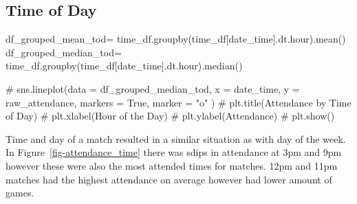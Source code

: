 \documentclass[
  letterpaper,
  DIV=11,
  numbers=noendperiod]{scrartcl}
\newenvironment{Shaded}{\begin{snugshade}}{\end{snugshade}}
\newcommand{\CommentTok}[1]{\textcolor[rgb]{0.37,0.37,0.37}{#1}}
\newcommand{\NormalTok}[1]{\textcolor[rgb]{0.00,0.23,0.31}{#1}}
\newcommand{\OperatorTok}[1]{\textcolor[rgb]{0.37,0.37,0.37}{#1}}
\newcommand{\StringTok}[1]{\textcolor[rgb]{0.13,0.47,0.30}{#1}}
\begin{document}
\hypertarget{time-of-day}{%
\subsection{Time of Day}\label{time-of-day}}

\begin{Shaded}
\begin{Highlighting}[]
\NormalTok{df\_grouped\_mean\_tod}\OperatorTok{=}\NormalTok{ time\_df.groupby(time\_df[}\StringTok{\textquotesingle{}date\_time\textquotesingle{}}\NormalTok{].dt.hour).mean()}
\NormalTok{df\_grouped\_median\_tod}\OperatorTok{=}\NormalTok{ time\_df.groupby(time\_df[}\StringTok{\textquotesingle{}date\_time\textquotesingle{}}\NormalTok{].dt.hour).median()}


\CommentTok{\# sns.lineplot(data = df\_grouped\_median\_tod, x = \textquotesingle{}date\_time\textquotesingle{}, y = \textquotesingle{}raw\_attendance\textquotesingle{}, markers = True, marker = "o" )}
\CommentTok{\# plt.title(\textquotesingle{}Attendance by Time of Day\textquotesingle{})}
\CommentTok{\# plt.xlabel(\textquotesingle{}Hour of the Day\textquotesingle{})}
\CommentTok{\# plt.ylabel(\textquotesingle{}Attendance\textquotesingle{})}
\CommentTok{\# plt.show()}
\end{Highlighting}
\end{Shaded}

Time and day of a match resulted in a similar situation as with day of
the week. In Figure~\ref{fig-attendance_time} there was sdips in
attendance at 3pm and 9pm however these were also the most attended
times for matches. 12pm and 11pm matches had the highest attendance on
average however had lower amount of games.
\end{document}

